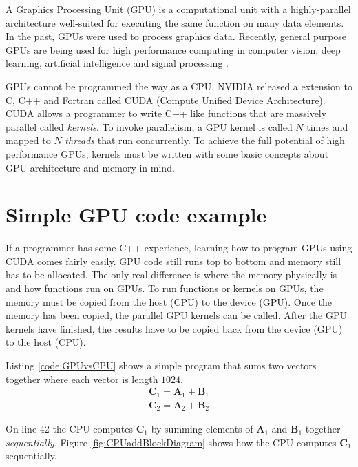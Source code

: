 A Graphics Processing Unit (GPU) is a computational unit with a highly-parallel architecture well-suited for executing the same function on many data elements.
In the past, GPUs were used to process graphics data.
Recently, general purpose GPUs are being used for high performance computing in computer vision, deep learning, artificial intelligence and signal processing \cite{wikipedia-gpu:2015}.

GPUs cannot be programmed the way as a CPU. 
NVIDIA released a extension to C, C++ and Fortran called CUDA (Compute Unified Device Architecture).
CUDA allows a programmer to write C++ like functions that are massively parallel called \textit{kernels}.
To invoke parallelism, a GPU kernel is called $N$ times and mapped to $N$ \textit{threads} that run concurrently.
To achieve the full potential of high performance GPUs, kernels must be written with some basic concepts about GPU architecture and memory in mind.

\section{Simple GPU code example}
If a programmer has some C++ experience, learning how to program GPUs using CUDA comes fairly easily.
GPU code still runs top to bottom and memory still has to be allocated.
The only real difference is where the memory physically is and how functions run on GPUs.
To run functions or kernels on GPUs, the memory must be copied from the host (CPU) to the device (GPU).
Once the memory has been copied, the parallel GPU kernels can be called.
After the GPU kernels have finished, the results have to be copied back from the device (GPU) to the host (CPU).

Listing \ref{code:GPUvsCPU} shows a simple program that sums two vectors together where each vector is length $1024$.
\begin{equation}
\begin{matrix}
\mathbf{C}_1 = \mathbf{A}_1 + \mathbf{B}_1 \\
\mathbf{C}_2 = \mathbf{A}_2 + \mathbf{B}_2
\end{matrix}
\end{equation}

On line $42$ the CPU computes $\mathbf{C}_1$ by summing elements of $\mathbf{A}_1$ and $\mathbf{B}_1$ together \textit{sequentially}. Figure \ref{fig:CPUaddBlockDiagram} shows how the CPU computes $\mathbf{C}_1$  sequentially.

